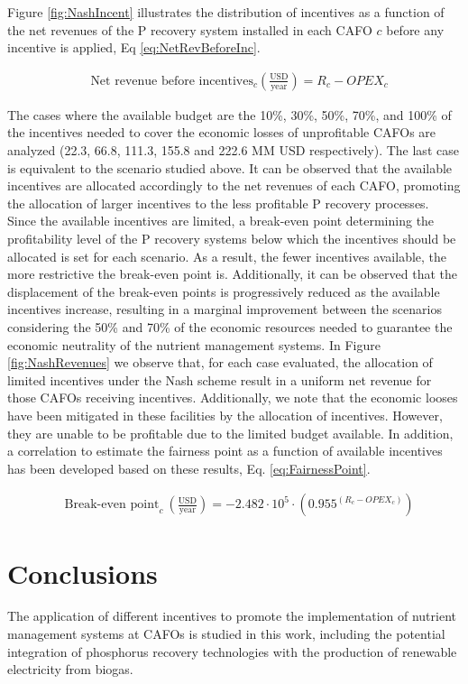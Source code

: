 \begin{refsection}[referencesCh5]
Figure \ref{fig:NashIncent} illustrates the distribution of incentives as a function of the net revenues of the P recovery system installed in each CAFO $c$ before any incentive is applied, Eq \ref{eq:NetRevBeforeInc}.

\begin{align}
& \text{Net revenue before incentives}_{c} \left(\frac{\text{USD}}{\text{year}}\right) = R_{c} - OPEX_{c} \label{eq:NetRevBeforeInc}
\end{align}

The cases where the available budget are the 10\%, 30\%, 50\%, 70\%, and 100\% of the incentives needed to cover the economic losses of unprofitable CAFOs are analyzed (22.3, 66.8, 111.3, 155.8 and 222.6 MM USD respectively). The last case is equivalent to the scenario studied above. It can be observed that the available incentives are allocated accordingly to the net revenues of each CAFO, promoting the allocation of larger incentives to the less profitable P recovery processes. Since the available incentives are limited, a break-even point determining the profitability level of the P recovery systems below which the incentives should be allocated is set for each scenario. As a result, the fewer incentives available, the more restrictive the break-even point is. Additionally, it can be observed that the displacement of the break-even points is progressively reduced as the available incentives increase, resulting in a marginal improvement between the scenarios considering the 50\% and 70\% of the economic resources needed to guarantee the economic neutrality of the nutrient management systems. In Figure \ref{fig:NashRevenues} we observe that, for each case evaluated, the allocation of limited incentives under the Nash scheme result in a uniform net revenue for those CAFOs receiving incentives. Additionally, we note that the economic looses have been mitigated in these facilities by the allocation of incentives. However, they are unable to be profitable due to the limited budget available. In addition, a correlation to estimate the fairness point as a function of available incentives has been developed based on these results, Eq. \ref{eq:FairnessPoint}.

\begin{align}
& \text{Break-even point}_c \ \left(\frac{\text{USD}}{\text{year}}\right) = -2.482\cdot10^{5} \cdot \left(0.955^{\left(R_{c} - OPEX_{c}\right)}\right) \label{eq:FairnessPoint}
\end{align}

\section{Conclusions}
The application of different incentives to promote the implementation of nutrient management systems at CAFOs is studied in this work, including the potential integration of phosphorus recovery technologies with the production of renewable electricity from biogas. 


\end{refsection}
